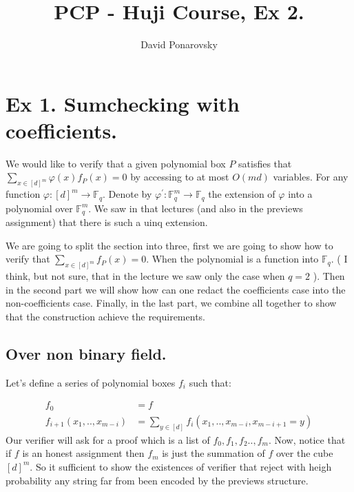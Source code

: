 \documentclass{article}
\title{PCP - Huji Course, Ex 2.}
\author{David Ponarovsky}
\newcommand{\FF}{\mathbb{F}_{q}}
\begin{document}
\maketitle

\section{Ex 1. Sumchecking with coefficients.}

We would like to verify that a given polynomial box $P$ satisfies that $ \sum_{x\in [d]^{m}}{ \varphi\left( x \right) f_{P}\left( x \right) } = 0 $  by accessing to at most $O\left(md\right)$ variables. For any function $\varphi : [d]^{m} \rightarrow \FF$. Denote by $\varphi^{\prime} : \FF^{m} \rightarrow \FF$ the extension of $\varphi$ into a polynomial over $\FF^{m}$. We saw in that lectures (and also in the previews assignment) that there is such a uinq extension. 

We are going to split the section into three, first we are going to show how to verify that $\sum_{x \in [d]^{m}}{ f_{P}\left( x \right) } = 0 $. When the polynomial is a function into $\FF$. ( I think, but not sure, that in the lecture we saw only the case when $q = 2$ ). Then in the second part we will show how can one redact the coefficients case into the non-coefficients case. Finally, in the last part, we combine all together to show that the construction achieve the requirements. 

\subsection{Over non binary field. } Let's define a series of polynomial boxes $f_{i}$ such that: 

\begin{equation*}
  \begin{split}
    f_{0} & = f \\ 
  f_{i+1} \left( x_{1}, .. , x_{m-i} \right) & = \sum_{y \in [d] } f_{i}\left(x_{1}, .. , x_{m-i}, x_{m-i+1} = y \right)
  \end{split}
\end{equation*}
Our verifier will ask for a proof which is a list of $f_{0}, f_{1}, f_{2} .., f_{m}$. Now, notice that if $f$ is an honest assignment then $f_{m}$ is just the summation of $f$ over the cube $[d]^{m}$. So it sufficient to show the existences of verifier that reject with heigh probability any string far from been encoded by the previews structure.
\end{document}
